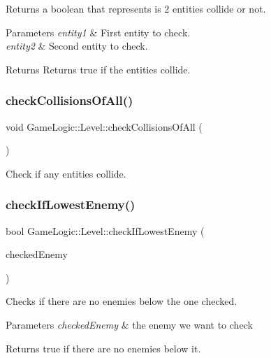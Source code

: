 Returns a boolean that represents is 2 entities collide or not. 
\begin{DoxyParams}{Parameters}
{\em entity1} & First entity to check. \\
\hline
{\em entity2} & Second entity to check. \\
\hline
\end{DoxyParams}
\begin{DoxyReturn}{Returns}
Returns true if the entities collide. 
\end{DoxyReturn}
\mbox{\label{classGameLogic_1_1Level_a9792c2e1bbb52931fe83355fcbb35b89}} 
\subsubsection{\texorpdfstring{check\+Collisions\+Of\+All()}{checkCollisionsOfAll()}}
{\footnotesize\ttfamily void Game\+Logic\+::\+Level\+::check\+Collisions\+Of\+All (\begin{DoxyParamCaption}{ }\end{DoxyParamCaption})}

Check if any entities collide. \mbox{\label{classGameLogic_1_1Level_a045b9a34d69596868df7c66f47d6912e}} 
\subsubsection{\texorpdfstring{check\+If\+Lowest\+Enemy()}{checkIfLowestEnemy()}}
{\footnotesize\ttfamily bool Game\+Logic\+::\+Level\+::check\+If\+Lowest\+Enemy (\begin{DoxyParamCaption}\item[{shared\+\_\+ptr$<$ \hyperlink{classGameLogic_1_1BasicEnemy}{Basic\+Enemy} $>$}]{checked\+Enemy }\end{DoxyParamCaption})}

Checks if there are no enemies below the one checked. 
\begin{DoxyParams}{Parameters}
{\em checked\+Enemy} & the enemy we want to check \\
\hline
\end{DoxyParams}
\begin{DoxyReturn}{Returns}
true if there are no enemies below it. 
\end{DoxyReturn}
\mbox{\label{classGameLogic_1_1Level_ad9ac3fbb69cbfe7552a5ce8737a4cfd5}} 
